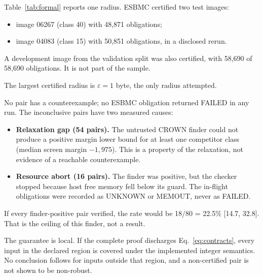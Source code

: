 Table~\ref{tab:formal} reports one radius. ESBMC certified two test images:
\begin{itemize}
  \item image 06267 (class 40) with 48,871 obligations;
  \item image 04083 (class 15) with 50,851 obligations, in a disclosed rerun.
\end{itemize}
A development image from the validation split was also certified, with 58,690 of 58,690 obligations. It is not part of the sample.

The largest certified radius is $\varepsilon = 1$ byte, the only radius attempted.

No pair has a counterexample; no ESBMC obligation returned FAILED in any run. The inconclusive pairs have two measured causes:
\begin{itemize}
  \item \textbf{Relaxation gap (54 pairs).} The untrusted CROWN finder could not produce a positive margin lower bound for at least one competitor class (median screen margin $-1{,}975$). This is a property of the relaxation, not evidence of a reachable counterexample.
  \item \textbf{Resource abort (16 pairs).} The finder was positive, but the checker stopped because host free memory fell below its guard. The in-flight obligations were recorded as UNKNOWN or MEMOUT, never as FAILED.
\end{itemize}
If every finder-positive pair verified, the rate would be 18/80 = 22.5\% [14.7, 32.8]. That is the ceiling of this finder, not a result.

The guarantee is local. If the complete proof discharges Eq.~\eqref{eq:contracts}, every input in the declared region is covered under the implemented integer semantics. No conclusion follows for inputs outside that region, and a non-certified pair is not shown to be non-robust.

